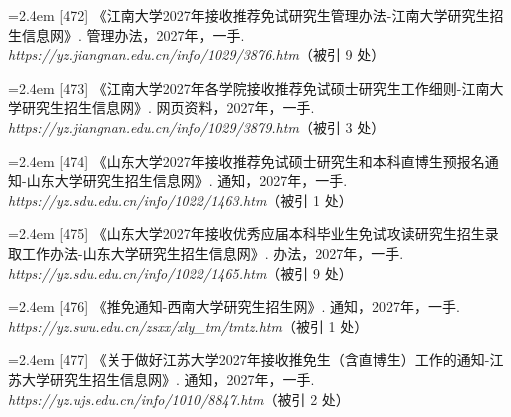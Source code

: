 {\vspace{0.6pt}
\vspace{3.5pt}\par
\nopagebreak\vspace{1pt}
\noindent\hangindent=2.4em \label{src:S0628}{\color{cAccent}[472]} 《江南大学2027年接收推荐免试研究生管理办法-江南大学研究生招生信息网》. 管理办法，2027年，一手. \textit{https://yz.jiangnan.edu.cn/info/1029/3876.htm}（被引 9 处）\par
\vspace{0.6pt}
\noindent\hangindent=2.4em \label{src:S0629}{\color{cAccent}[473]} 《江南大学2027年各学院接收推荐免试硕士研究生工作细则-江南大学研究生招生信息网》. 网页资料，2027年，一手. \textit{https://yz.jiangnan.edu.cn/info/1029/3879.htm}（被引 3 处）\par
\vspace{0.6pt}
\vspace{3.5pt}\par
\nopagebreak\vspace{1pt}
\noindent\hangindent=2.4em \label{src:S0630}{\color{cAccent}[474]} 《山东大学2027年接收推荐免试硕士研究生和本科直博生预报名通知-山东大学研究生招生信息网》. 通知，2027年，一手. \textit{https://yz.sdu.edu.cn/info/1022/1463.htm}（被引 1 处）\par
\vspace{0.6pt}
\noindent\hangindent=2.4em \label{src:S0631}{\color{cAccent}[475]} 《山东大学2027年接收优秀应届本科毕业生免试攻读研究生招生录取工作办法-山东大学研究生招生信息网》. 办法，2027年，一手. \textit{https://yz.sdu.edu.cn/info/1022/1465.htm}（被引 9 处）\par
\vspace{0.6pt}
\vspace{3.5pt}\par
\nopagebreak\vspace{1pt}
\noindent\hangindent=2.4em \label{src:S0632}{\color{cAccent}[476]} 《推免通知-西南大学研究生招生网》. 通知，2027年，一手. \textit{https://yz.swu.edu.cn/zsxx/xly\_tm/tmtz.htm}（被引 1 处）\par
\vspace{0.6pt}
\vspace{3.5pt}\par
\nopagebreak\vspace{1pt}
\noindent\hangindent=2.4em \label{src:S0633}{\color{cAccent}[477]} 《关于做好江苏大学2027年接收推免生（含直博生）工作的通知-江苏大学研究生招生信息网》. 通知，2027年，一手. \textit{https://yz.ujs.edu.cn/info/1010/8847.htm}（被引 2 处）\par
}
